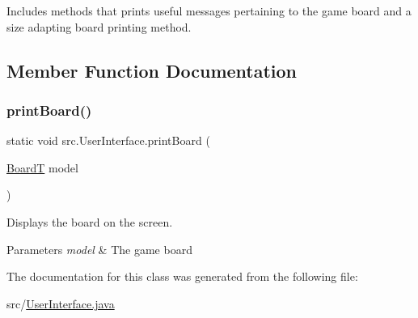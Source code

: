 Includes methods that prints useful messages pertaining to the game board and a size adapting board printing method. 

\subsection{Member Function Documentation}
\mbox{\label{classsrc_1_1UserInterface_a853bb521a3732a56c99233034edaeb7d}} 
\subsubsection{\texorpdfstring{print\+Board()}{printBoard()}}
{\footnotesize\ttfamily static void src.\+User\+Interface.\+print\+Board (\begin{DoxyParamCaption}\item[{\hyperlink{classsrc_1_1BoardT}{BoardT}}]{model }\end{DoxyParamCaption})\hspace{0.3cm}{\ttfamily [static]}}



Displays the board on the screen. 


\begin{DoxyParams}{Parameters}
{\em model} & The game board \\
\hline
\end{DoxyParams}


The documentation for this class was generated from the following file\+:\begin{DoxyCompactItemize}
\item 
src/\hyperlink{UserInterface_8java}{User\+Interface.\+java}\end{DoxyCompactItemize}
